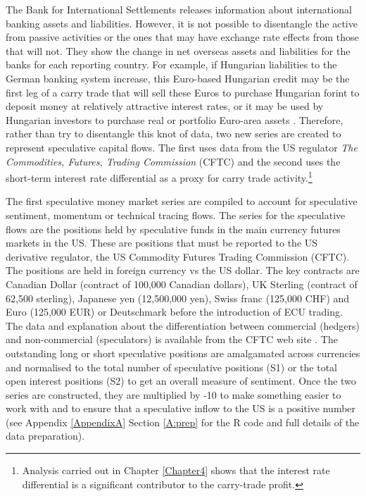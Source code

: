 \documentclass[12pt, a4paper, oneside]{article}\usepackage[]{graphicx}\usepackage[]{color}
\begin{document}
The Bank for International Settlements releases information about international banking assets and liabilities.  However, it is not possible to disentangle the active from passive activities or the ones that may have exchange rate effects from those that will not.  They show the change in net overseas assets and liabilities for the banks for each reporting country.  For example, if Hungarian liabilities to the German banking system increase, this Euro-based Hungarian credit may be the first leg of a carry trade that will sell these Euros to purchase Hungarian forint to deposit money at relatively attractive interest rates, or it may be used by Hungarian investors to purchase real or portfolio Euro-area assets \citep{BISbanking}. Therefore, rather than try to disentangle this knot of data, two new series are created to represent speculative capital flows.  The first uses data from the US regulator \emph{The Commodities, Futures, Trading Commission} (CFTC) and the second uses the short-term interest rate differential as a proxy for carry trade activity.\footnote{Analysis carried out in Chapter \ref{Chapter4} shows that the interest rate differential is a significant contributor to the carry-trade profit.}  

The first speculative money market series are compiled to account for speculative sentiment, momentum or technical tracing flows.  The series for the speculative flows are the positions held by speculative funds in the main currency futures markets in the US.  These are positions that must be reported to the US derivative regulator, the US Commodity Futures Trading Commission (CFTC).  The positions are held in foreign currency vs the US dollar.  The key contracts are Canadian Dollar (contract of 100,000 Canadian dollars), UK Sterling (contract of 62,500 sterling), Japanese yen (12,500,000 yen), Swiss franc (125,000 CHF) and Euro (125,000 EUR) or Deutschmark before the introduction of ECU trading.  The data and explanation about the differentiation between commercial (hedgers) and non-commercial (speculators) is available from the CFTC web site \citep{cot}.   The outstanding long or short speculative positions are amalgamated across currencies and normalised to the total number of speculative positions (S1) or the total open interest positions (S2) to get an overall measure of sentiment.  Once the two series are constructed, they are multiplied by -10 to make something easier to work with and to ensure that a speculative inflow to the US is a positive number (see Appendix \ref{AppendixA} Section \ref{A:prep} for the R code and full details of the data preparation). 
\end{document}
